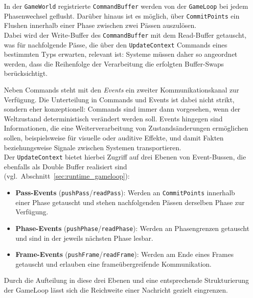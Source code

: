 \vspace{5mm}
\begin{tcolorbox}[title={Verarbeitungsreihenfolge von Befehlen}, colback=black!5, colframe=black]
    In der \texttt{GameWorld} registrierte \texttt{CommandBuffer} werden von der \texttt{GameLoop} bei jedem Phasenwechsel geflusht.
    Darüber hinaus ist es möglich, über \texttt{CommitPoints} ein Flushen innerhalb einer Phase zwischen zwei Pässen auszulösen.\\
    Dabei wird der Write-Buffer des \texttt{CommandBuffer} mit dem Read-Buffer getauscht, was für nachfolgende Pässe, die über den \texttt{UpdateContext} Commands eines bestimmten Typs erwarten, relevant ist:
    Systeme müssen daher so angeordnet werden, dass die Reihenfolge der Verarbeitung die erfolgten Buffer-Swaps berücksichtigt.
\end{tcolorbox}
\vspace{5mm}

Neben Commands steht mit den \textit{Events} ein zweiter Kommunikationskanal zur Verfügung.
Die Unterteilung in Commands und Events ist dabei nicht strikt, sondern eher konzeptionell:
Commands sind immer dann vorgesehen, wenn der Weltzustand deterministisch verändert werden soll.
Events hingegen sind Informationen, die eine Weiterverarbeitung von Zustandsänderungen ermöglichen sollen, beispielsweise für visuelle oder auditive Effekte, und damit Fakten beziehungsweise Signale zwischen Systemen transportieren.\\

Der \texttt{UpdateContext} bietet hierbei Zugriff auf drei Ebenen von Event-Bussen, die ebenfalls als Double Buffer realisiert sind (vgl.\ Abschnitt~\ref{sec:runtime_gameloop}):

\begin{itemize}
    \itemsep0.3em
    \item \textbf{Pass-Events} (\texttt{pushPass}/\texttt{readPass}): Werden an \texttt{CommitPoints} innerhalb einer Phase getauscht und stehen nachfolgenden Pässen derselben Phase zur Verfügung.
    \item \textbf{Phase-Events} (\texttt{pushPhase}/\texttt{readPhase}): Werden an Phasengrenzen getauscht und sind in der jeweils nächsten Phase lesbar.
    \item \textbf{Frame-Events} (\texttt{pushFrame}/\texttt{readFrame}): Werden am Ende eines Frames getauscht und erlauben eine frameübergreifende Kommunikation.
\end{itemize}

Durch die Aufteilung in diese drei Ebenen und eine entsprechende Strukturierung der GameLoop lässt sich die Reichweite einer Nachricht gezielt eingrenzen.